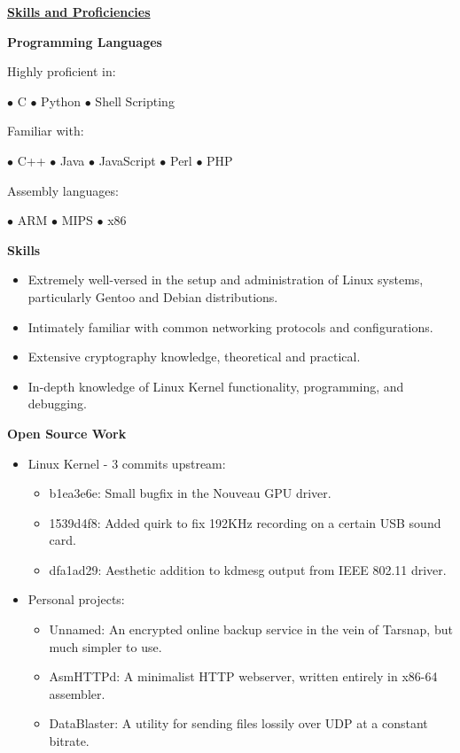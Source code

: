 \documentclass[11pt]{article}
\begin{document}
\noindent
\hrulefill

\centerline{\underline{\bf Skills and Proficiencies}}

\begin{multicols}{2}

\centerline{\bf Programming Languages}
\bigskip
\noindent Highly proficient in:\\
\centerline{\hfill $\bullet$ C \hfill $\bullet$ Python \hfill $\bullet$ Shell Scripting \hfill}
\noindent Familiar with:\\
\centerline{\hfill $\bullet$ C++ \hfill $\bullet$ Java \hfill $\bullet$ JavaScript \hfill $\bullet$ Perl \hfill $\bullet$ PHP \hfill}
\noindent Assembly languages:\\
\centerline{\hfill $\bullet$ ARM \hfill $\bullet$ MIPS \hfill $\bullet$ x86 \hfill}

\bigskip

\centerline{\bf Skills}
\begin{itemize}[leftmargin=*]
\itemsep 0em
	\item Extremely well-versed in the setup and administration of Linux systems, particularly Gentoo and Debian distributions.
	\item Intimately familiar with common networking protocols and configurations.
	\item Extensive cryptography knowledge, theoretical and practical.
	\item In-depth knowledge of Linux Kernel functionality, programming, and debugging.
\end{itemize}

\columnbreak

\centerline{\bf Open Source Work}
\begin{itemize}[leftmargin=*]
\itemsep 0em
	\item Linux Kernel - 3 commits upstream:
	\begin{itemize}
	\itemsep 0em
		\item b1ea3e6e: Small bugfix in the Nouveau GPU driver.
		\item 1539d4f8: Added quirk to fix 192KHz recording on a certain USB sound card.
		\item dfa1ad29: Aesthetic addition to kdmesg output from IEEE 802.11 driver.
	\end{itemize}
	\item Personal projects:
	\begin{itemize}
	\itemsep 0em
		\item Unnamed: An encrypted online backup service in the vein of Tarsnap, but much simpler to use.
		\item AsmHTTPd: A minimalist HTTP webserver, written entirely in x86-64 assembler.
		\item DataBlaster: A utility for sending files lossily over UDP at a constant bitrate.
	\end{itemize}
\end{itemize}

\end{multicols}
\end{document}
